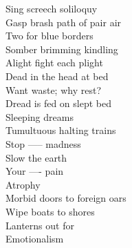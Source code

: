 Sing screech soliloquy\\
Gasp brash path of pair air\\
Two for blue borders\\
Somber brimming kindling\\
Alight fight each plight\\
Dead in the head at bed\\
Want waste; why rest?\\
Dread is fed on slept bed\\
Sleeping dreams\\
Tumultuous halting trains\\
Stop ----- madness\\
Slow the earth\\
Your ---- pain\\
Atrophy\\
Morbid doors to foreign oars\\
Wipe boats to shores\\
Lanterns out for\\
Emotionalism\\

